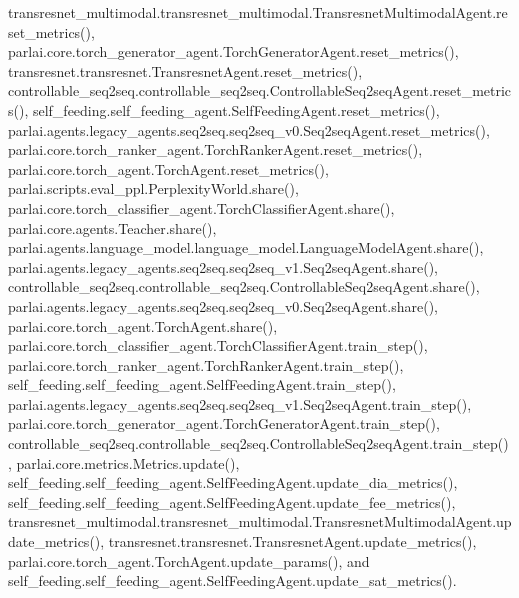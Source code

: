 transresnet\+\_\+multimodal.\+transresnet\+\_\+multimodal.\+Transresnet\+Multimodal\+Agent.\+reset\+\_\+metrics(), parlai.\+core.\+torch\+\_\+generator\+\_\+agent.\+Torch\+Generator\+Agent.\+reset\+\_\+metrics(), transresnet.\+transresnet.\+Transresnet\+Agent.\+reset\+\_\+metrics(), controllable\+\_\+seq2seq.\+controllable\+\_\+seq2seq.\+Controllable\+Seq2seq\+Agent.\+reset\+\_\+metrics(), self\+\_\+feeding.\+self\+\_\+feeding\+\_\+agent.\+Self\+Feeding\+Agent.\+reset\+\_\+metrics(), parlai.\+agents.\+legacy\+\_\+agents.\+seq2seq.\+seq2seq\+\_\+v0.\+Seq2seq\+Agent.\+reset\+\_\+metrics(), parlai.\+core.\+torch\+\_\+ranker\+\_\+agent.\+Torch\+Ranker\+Agent.\+reset\+\_\+metrics(), parlai.\+core.\+torch\+\_\+agent.\+Torch\+Agent.\+reset\+\_\+metrics(), parlai.\+scripts.\+eval\+\_\+ppl.\+Perplexity\+World.\+share(), parlai.\+core.\+torch\+\_\+classifier\+\_\+agent.\+Torch\+Classifier\+Agent.\+share(), parlai.\+core.\+agents.\+Teacher.\+share(), parlai.\+agents.\+language\+\_\+model.\+language\+\_\+model.\+Language\+Model\+Agent.\+share(), parlai.\+agents.\+legacy\+\_\+agents.\+seq2seq.\+seq2seq\+\_\+v1.\+Seq2seq\+Agent.\+share(), controllable\+\_\+seq2seq.\+controllable\+\_\+seq2seq.\+Controllable\+Seq2seq\+Agent.\+share(), parlai.\+agents.\+legacy\+\_\+agents.\+seq2seq.\+seq2seq\+\_\+v0.\+Seq2seq\+Agent.\+share(), parlai.\+core.\+torch\+\_\+agent.\+Torch\+Agent.\+share(), parlai.\+core.\+torch\+\_\+classifier\+\_\+agent.\+Torch\+Classifier\+Agent.\+train\+\_\+step(), parlai.\+core.\+torch\+\_\+ranker\+\_\+agent.\+Torch\+Ranker\+Agent.\+train\+\_\+step(), self\+\_\+feeding.\+self\+\_\+feeding\+\_\+agent.\+Self\+Feeding\+Agent.\+train\+\_\+step(), parlai.\+agents.\+legacy\+\_\+agents.\+seq2seq.\+seq2seq\+\_\+v1.\+Seq2seq\+Agent.\+train\+\_\+step(), parlai.\+core.\+torch\+\_\+generator\+\_\+agent.\+Torch\+Generator\+Agent.\+train\+\_\+step(), controllable\+\_\+seq2seq.\+controllable\+\_\+seq2seq.\+Controllable\+Seq2seq\+Agent.\+train\+\_\+step(), parlai.\+core.\+metrics.\+Metrics.\+update(), self\+\_\+feeding.\+self\+\_\+feeding\+\_\+agent.\+Self\+Feeding\+Agent.\+update\+\_\+dia\+\_\+metrics(), self\+\_\+feeding.\+self\+\_\+feeding\+\_\+agent.\+Self\+Feeding\+Agent.\+update\+\_\+fee\+\_\+metrics(), transresnet\+\_\+multimodal.\+transresnet\+\_\+multimodal.\+Transresnet\+Multimodal\+Agent.\+update\+\_\+metrics(), transresnet.\+transresnet.\+Transresnet\+Agent.\+update\+\_\+metrics(), parlai.\+core.\+torch\+\_\+agent.\+Torch\+Agent.\+update\+\_\+params(), and self\+\_\+feeding.\+self\+\_\+feeding\+\_\+agent.\+Self\+Feeding\+Agent.\+update\+\_\+sat\+\_\+metrics().

